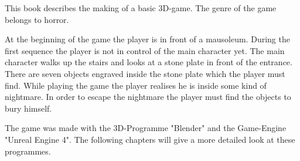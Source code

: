 This book describes the making of a basic 3D-game.
The genre of the game belongs to horror.

At the beginning of the game the player is in front of a mausoleum.
During the first sequence the player is not in control of the main character yet.
The main character walks up the stairs and looks at a stone plate in front of the entrance.
There are seven objects engraved inside the stone plate which the player must find.
While playing the game the player realises he is inside some kind of nightmare.
In order to escape the nightmare the player must find the objects to bury himself.

The game was made with the 3D-Programme "Blender" and the Game-Engine "Unreal Engine 4".
The following chapters will give a more detailed look at these programmes.